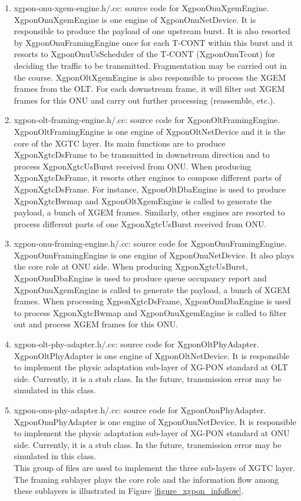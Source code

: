 \begin{enumerate}
 \item xgpon-onu-xgem-engine.h/.cc: source code for {\color{red} XgponOnuXgemEngine}. XgponOnuXgemEngine is one engine 
of XgponOnuNetDevice. It is responsible to produce the payload of one upstream burst. It is also resorted 
by XgponOnuFramingEngine once for each T-CONT within this burst and it resorts to XgponOnuUsScheduler 
of the T-CONT (XgponOnuTcont) for deciding the traffic to be transmitted. Fragmentation may be carried out 
in the course. XgponOltXgemEngine is also responsible to process the XGEM frames from the OLT. 
For each downstream frame, it will filter out XGEM frames for this ONU and carry out further processing (reassemble, etc.).
\vspace{0.1in}

 \item xgpon-olt-framing-engine.h/.cc: source code for {\color{red} XgponOltFramingEngine}. XgponOltFramingEngine is one engine 
of XgponOltNetDevice and it is the core of the XGTC layer. Its main functions are to produce XgponXgtcDsFrame to be transmitted 
in downstream direction and to process XgponXgtcUsBurst received from ONU. When producing XgponXgtcDsFrame, 
it resorts other engines to compose different parts of XgponXgtcDsFrame. For instance, XgponOltDbaEngine is used to 
produce XgponXgtcBwmap and XgponOltXgemEngine is called to generate the payload, a bunch of XGEM frames. Similarly, 
other engines are resorted to process different parts of one XgponXgtcUsBurst received from ONU.

 \item xgpon-onu-framing-engine.h/.cc: source code for {\color{red} XgponOnuFramingEngine}. XgponOnuFramingEngine is one engine 
of XgponOnuNetDevice. It also plays the core role at ONU side. When producing XgponXgtcUsBurst, XgponOnuDbaEngine is used to 
produce queue occupancy report and XgponOnuXgemEngine is called to generate the payload, a bunch of XGEM frames. 
When processing XgponXgtcDsFrame, XgponOnuDbaEngine is used to process XgponXgtcBwmap and XgponOnuXgemEngine is called 
to filter out and process XGEM frames for this ONU.
\vspace{0.1in}

 \item xgpon-olt-phy-adapter.h/.cc: source code for {\color{red} XgponOltPhyAdapter}. XgponOltPhyAdapter is one engine 
of XgponOltNetDevice. It is responsible to implement the physic adaptation sub-layer of XG-PON standard at OLT side. 
Currently, it is a stub class. In the future, transmission error may be simulated in this class.
 \item xgpon-onu-phy-adapter.h/.cc: source code for {\color{red} XgponOnuPhyAdapter}.  XgponOnuPhyAdapter is one engine 
of XgponOnuNetDevice. It is responsible to implement the physic adaptation sub-layer of XG-PON standard at ONU side. 
Currently, it is a stub class. In the future, transmission error may be simulated in this class.
\\
{\color{blue} This group of files are used to implement the three sub-layers of XGTC layer. The framing sublayer 
plays the core role and the information flow among these sublayers is illustrated in Figure \ref{figure_xgpon_infoflow}.}


\end{enumerate}
